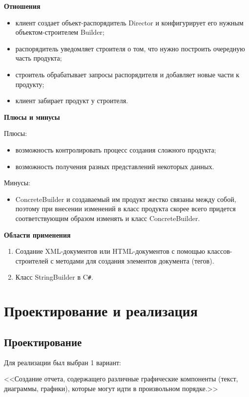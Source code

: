 \documentclass[PI,LAB]{HSEUniversity}
\begin{document}
\textbf{Отношения}
\begin{itemize}
  \item клиент создает объект-распорядитель Director и конфигурирует его нужным объектом-строителем Builder;
  \item распорядитель уведомляет строителя о том, что нужно построить очередную часть продукта;
  \item строитель обрабатывает запросы распорядителя и добавляет новые части к продукту;
  \item клиент забирает продукт у строителя.  
\end{itemize}

\textbf{Плюсы и минусы}

Плюсы:
\begin{itemize}
   \item возможность контролировать процесс создания сложного продукта;
   \item возможность получения разных представлений некоторых данных. 
  \end{itemize}

Минусы:
\begin{itemize}
  \item ConcreteBuilder и создаваемый им продукт жестко связаны между собой, поэтому при внесении изменений в класс продукта скорее всего придется соответствующим образом изменять и класс ConcreteBuilder. 
\end{itemize}
\clearpage

\textbf{Области применения}

\begin{enumerate}
  \item Создание XML-документов или HTML-документов с помощью классов-строителей с методами для создания элементов документа (тегов).
  \item Класс StringBuilder в C\verb|#|.
\end{enumerate}

\chapter{Проектирование и реализация}
\section{Проектирование}
Для реализации был выбран 1 вариант:

<<Создание отчета, содержащего различные графические компоненты (текст, диаграммы, графики), которые могут идти в произвольном порядке.>>
\end{document}
